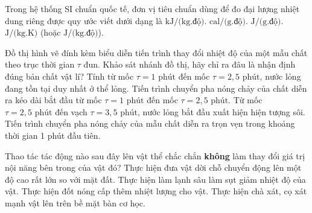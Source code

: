 \begin{ex}%
	Trong hệ thống SI chuẩn quốc tế, đơn vị tiêu chuẩn dùng để đo đại lượng nhiệt dung riêng được quy ước viết dưới dạng là
	\choice
	{$\text{kJ/(kg.độ)}$.}
	{$\text{cal/(g.độ)}$.}
	{$\text{J/(g.độ)}$.}
	{\True $\text{J/(kg.K)}$ (hoặc $\text{J/(kg.độ)}$).}
\end{ex}

\begin{ex}%
	Đồ thị hình vẽ đính kèm biểu diễn tiến trình thay đổi nhiệt độ của một mẫu chất theo trục thời gian $\tau$ đun. Khảo sát nhánh đồ thị, hãy chỉ ra đâu là nhận định đúng bản chất vật lí?
	\choice
	{Tính từ mốc $\tau = 1\text{ phút}$ đến mốc $\tau = 2,5\text{ phút}$, nước lỏng đang tồn tại duy nhất ở thể lỏng.}
	{\True Tiến trình chuyển pha nóng chảy của chất diễn ra kéo dài bắt đầu từ mốc $\tau = 1\text{ phút}$ đến mốc $\tau = 2,5\text{ phút}$.}
	{Từ mốc $\tau = 2,5\text{ phút}$ đến vạch $\tau = 3,5\text{ phút}$, nước lỏng bắt đầu xuất hiện hiện tượng sôi.}
	{Tiến trình chuyển pha nóng chảy của mẫu chất diễn ra trọn vẹn trong khoảng thời gian 1 phút đầu tiên.}
\end{ex}

\begin{ex}%
	Thao tác tác động nào sau đây lên vật thể chắc chắn \textbf{không} làm thay đổi giá trị nội năng bên trong của vật đó?
	\choice
	{\True Thực hiện đưa vật dời chỗ chuyển động lên một độ cao rất lớn so với mặt đất.}
	{Thực hiện làm lạnh sâu làm sụt giảm nhiệt độ của vật.}
	{Thực hiện đốt nóng cấp thêm nhiệt lượng cho vật.}
	{Thực hiện chà xát, cọ xát mạnh vật lên trên bề mặt bàn cơ học.}
\end{ex}

